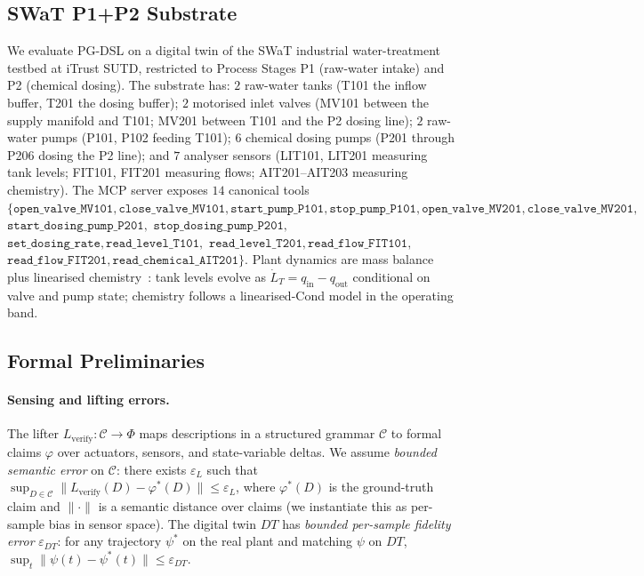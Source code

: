 \subsection{SWaT P1+P2 Substrate}

We evaluate PG-DSL on a digital twin of the SWaT industrial
water-treatment testbed at iTrust SUTD, restricted to Process Stages
P1 (raw-water intake) and P2 (chemical dosing). The substrate has:
$2$ raw-water tanks (T101 the inflow buffer, T201 the dosing buffer);
$2$ motorised inlet valves (MV101 between the supply manifold and
T101; MV201 between T101 and the P2 dosing line); $2$ raw-water
pumps (P101, P102 feeding T101); $6$ chemical dosing pumps (P201
through P206 dosing the P2 line); and $7$ analyser sensors (LIT101,
LIT201 measuring tank levels; FIT101, FIT201 measuring flows;
AIT201--AIT203 measuring chemistry). The MCP server exposes $14$
canonical tools $\{\texttt{open\_valve\_MV101},
\texttt{close\_valve\_MV101}, \texttt{start\_pump\_P101},
\texttt{stop\_pump\_P101}, \texttt{open\_valve\_MV201},
\texttt{close\_valve\_MV201},$ $\texttt{start\_dosing\_pump\_P201},$
$\texttt{stop\_dosing\_pump\_P201},$
$\texttt{set\_dosing\_rate}, \texttt{read\_level\_T101},$
$\texttt{read\_level\_T201}, \texttt{read\_flow\_FIT101},$
$\texttt{read\_flow\_FIT201}, \texttt{read\_chemical\_AIT201}\}$.
Plant dynamics are mass balance plus linearised
chemistry~\cite{minicps}: tank levels evolve as $\dot L_T = q_{\text{in}}
- q_{\text{out}}$ conditional on valve and pump state; chemistry
follows a linearised-Cond model in the operating band.

\subsection{Formal Preliminaries}

\paragraph{Sensing and lifting errors.}
The lifter $L_{\text{verify}}: \mathcal{C} \to \Phi$ maps
descriptions in a structured grammar $\mathcal{C}$ to formal claims
$\varphi$ over actuators, sensors, and state-variable deltas. We
assume \emph{bounded semantic error} on $\mathcal{C}$: there exists
$\varepsilon_L$ such that $\sup_{D \in \mathcal{C}}
\|L_{\text{verify}}(D) - \varphi^{*}(D)\| \leq \varepsilon_L$, where
$\varphi^{*}(D)$ is the ground-truth claim and $\|\cdot\|$ is a
semantic distance over claims (we instantiate this as per-sample
bias in sensor space). The digital twin $\mathit{DT}$ has \emph{bounded
per-sample fidelity error} $\varepsilon_{DT}$: for any trajectory
$\psi^*$ on the real plant and matching $\psi$ on $\mathit{DT}$,
$\sup_t \|\psi(t) - \psi^*(t)\| \leq \varepsilon_{DT}$.

